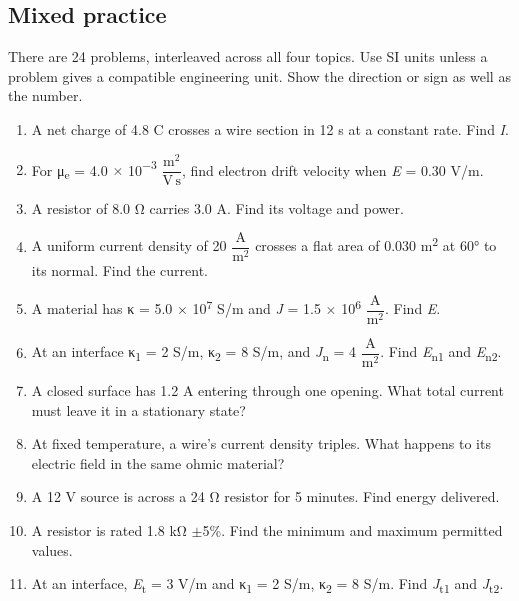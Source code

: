 \documentclass[11pt]{article}
\begin{document}
\begin{keepsection}
\section{Mixed practice}

There are 24 problems, interleaved across all four topics. Use SI units unless a problem gives a compatible engineering unit. Show the direction or sign as well as the number.

\begin{enumerate}
\item A net charge of 4.8 C crosses a wire section in 12 s at a constant rate. Find \textit{I}.
\item For μ\textsubscript{e} = 4.0 \ensuremath{\times} 10\textsuperscript{\ensuremath{-}3} {\small\ensuremath{\dfrac{\mathrm{m}^{2}}{\mathrm{V}\, \mathrm{s}}}}, find electron drift velocity when \textit{E} = 0.30 V/m.
\item A resistor of 8.0 Ω carries 3.0 A. Find its voltage and power.
\item A uniform current density of 20 {\small\ensuremath{\dfrac{\mathrm{A}}{\mathrm{m}^{2}}}} crosses a flat area of 0.030 m\textsuperscript{2} at 60° to its normal. Find the current.
\item A material has κ = 5.0 \ensuremath{\times} 10\textsuperscript{7} S/m and \textit{J} = 1.5 \ensuremath{\times} 10\textsuperscript{6} {\small\ensuremath{\dfrac{\mathrm{A}}{\mathrm{m}^{2}}}}. Find \textit{E}.
\item At an interface κ\textsubscript{1} = 2 S/m, κ\textsubscript{2} = 8 S/m, and \textit{J}\textsubscript{n} = 4 {\small\ensuremath{\dfrac{\mathrm{A}}{\mathrm{m}^{2}}}}. Find \textit{E}\textsubscript{n1} and \textit{E}\textsubscript{n2}.
\item A closed surface has 1.2 A entering through one opening. What total current must leave it in a stationary state?
\item At fixed temperature, a wire’s current density triples. What happens to its electric field in the same ohmic material?
\item A 12 V source is across a 24 Ω resistor for 5 minutes. Find energy delivered.
\item A resistor is rated 1.8 kΩ \ensuremath{\pm}5\%. Find the minimum and maximum permitted values.
\item At an interface, \textit{E}\textsubscript{t} = 3 V/m and κ\textsubscript{1} = 2 S/m, κ\textsubscript{2} = 8 S/m. Find \textit{J}\textsubscript{t1} and \textit{J}\textsubscript{t2}.

\end{enumerate}
\end{keepsection}
\end{document}
